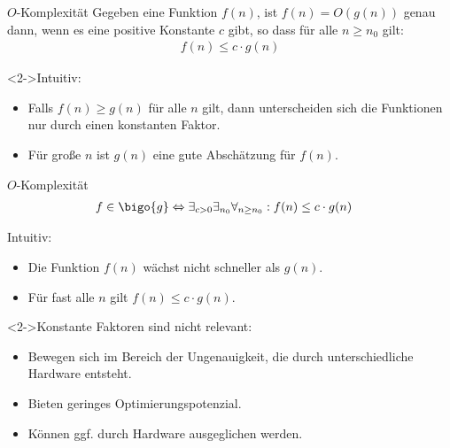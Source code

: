 \begin{frame}
    \begin{defblock}{$O$-Komplexität}
        Gegeben eine Funktion $f(n)$, ist $f(n) = O(g(n))$ genau dann, wenn es eine positive Konstante $c$ gibt, so dass für alle $n \geq n_0$ gilt:
        \begin{align*}
            f(n) \leq c \cdot g(n)
        \end{align*}
    \end{defblock}
    \begin{block}<2->{Intuitiv:}
        \begin{itemize}
            \item Falls $f(n) \geq g(n)$ für alle $n$ gilt, dann unterscheiden sich
                  die Funktionen nur durch einen konstanten Faktor.
            \item Für große $n$ ist $g(n)$ eine gute Abschätzung für $f(n)$.
        \end{itemize}
    \end{block}
\end{frame}

\begin{frame}
    \begin{defblock}{$O$-Komplexität}
        \vspace{-3ex}
        \begin{align*}
            f \in \bigo{g} &\Leftrightarrow \exists_{c>0} \exists_{n_0} \forall_{n \geq n_0}: f(n) \leq c \cdot g(n)
        \end{align*}
    \end{defblock}
    \begin{block}{Intuitiv:}
        \begin{itemize}
            \item Die Funktion $f(n)$ wächst nicht schneller als $g(n)$.
            \item Für \alert{fast alle $n$} gilt $f(n) \leq c \cdot g(n)$.
        \end{itemize}
    \end{block}
    \begin{block}<2->{Konstante Faktoren sind nicht relevant:}
        \begin{itemize}
            \item Bewegen sich im Bereich der Ungenauigkeit, die durch unterschiedliche Hardware entsteht.
            \item Bieten geringes Optimierungspotenzial.
            \item Können ggf. durch Hardware ausgeglichen werden.
        \end{itemize}
    \end{block}
\end{frame}
